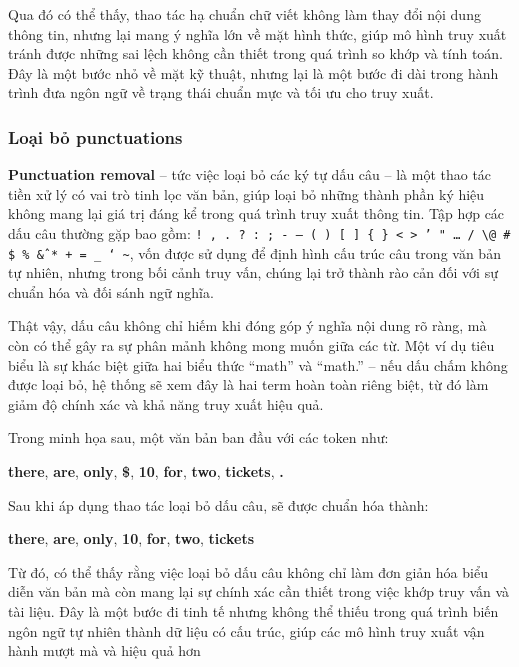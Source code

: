 Qua đó có thể thấy, thao tác hạ chuẩn chữ viết không làm thay đổi nội dung thông tin, nhưng lại mang ý nghĩa lớn về mặt hình thức, giúp mô hình truy xuất tránh được những sai lệch không cần thiết trong quá trình so khớp và tính toán. Đây là một bước nhỏ về mặt kỹ thuật, nhưng lại là một bước đi dài trong hành trình đưa ngôn ngữ về trạng thái chuẩn mực và tối ưu cho truy xuất.

\subsubsection{Loại bỏ punctuations}
\textbf{Punctuation removal} -- tức việc loại bỏ các ký tự dấu câu -- là một thao tác tiền xử lý có vai trò tinh lọc văn bản, giúp loại bỏ những thành phần ký hiệu không mang lại giá trị đáng kể trong quá trình truy xuất thông tin. Tập hợp các dấu câu thường gặp bao gồm: \texttt{! , . ? : ; - — ( ) [ ] \{ \} < > ' " … / \textbackslash @ \# \$ \% \^ \& * + = \_ ` \textasciitilde}, vốn được sử dụng để định hình cấu trúc câu trong văn bản tự nhiên, nhưng trong bối cảnh truy vấn, chúng lại trở thành rào cản đối với sự chuẩn hóa và đối sánh ngữ nghĩa.

Thật vậy, dấu câu không chỉ hiếm khi đóng góp ý nghĩa nội dung rõ ràng, mà còn có thể gây ra sự phân mảnh không mong muốn giữa các từ. Một ví dụ tiêu biểu là sự khác biệt giữa hai biểu thức ``math'' và ``math.'' -- nếu dấu chấm không được loại bỏ, hệ thống sẽ xem đây là hai term hoàn toàn riêng biệt, từ đó làm giảm độ chính xác và khả năng truy xuất hiệu quả.

Trong minh họa sau, một văn bản ban đầu với các token như:
\begin{center}
    \textbf{there}, \textbf{are}, \textbf{only}, \textbf{\$}, \textbf{10}, \textbf{for}, \textbf{two}, \textbf{tickets}, \textbf{.}
\end{center}

Sau khi áp dụng thao tác loại bỏ dấu câu, sẽ được chuẩn hóa thành:
\begin{center}
    \textbf{there}, \textbf{are}, \textbf{only}, \textbf{10}, \textbf{for}, \textbf{two}, \textbf{tickets}
\end{center}

Từ đó, có thể thấy rằng việc loại bỏ dấu câu không chỉ làm đơn giản hóa biểu diễn văn bản mà còn mang lại sự chính xác cần thiết trong việc khớp truy vấn và tài liệu. Đây là một bước đi tinh tế nhưng không thể thiếu trong quá trình biến ngôn ngữ tự nhiên thành dữ liệu có cấu trúc, giúp các mô hình truy xuất vận hành mượt mà và hiệu quả hơn


